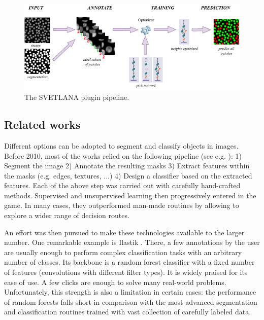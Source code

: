 \documentclass{article}
\begin{document}
\begin{figure}[htp!]
 \centering
 \includegraphics[width=\linewidth]{Figures/pipeline_svetlana.pdf}
  \caption{The SVETLANA plugin pipeline. \label{fig:pipeline}}
\end{figure}


\subsection{Related works}

Different options can be adopted to segment and classify objects in images. 
Before 2010, most of the works relied on the following pipeline (see e.g. \cite{irshad2013methods}): 1) Segment the image 2) Annotate the resulting masks 3) Extract features within the masks (e.g. edges, textures, ...) 4) Design a classifier based on the extracted features. 
Each of the above step was carried out with carefully hand-crafted methods. 
Supervised and unsupervised learning then progressively entered in the game. 
In many cases, they outperformed man-made routines by allowing to explore a wider range of decision routes. 

An effort was then pursued to make these technologies available to the larger number. One remarkable example is Ilastik \cite{berg2019ilastik}. There, a few annotations by the user are usually enough to perform complex classification tasks with an arbitrary number of classes. Its backbone is a random forest classifier with a fixed number of features (convolutions with different filter types). It is widely praised for its ease of use. A few clicks are enough to solve many real-world problems. Unfortunately, this strength is also a limitation in certain cases: the performance of random forests falls short in comparison with the most advanced segmentation and classification routines trained with vast collection of carefully labeled data. 
\end{document}
